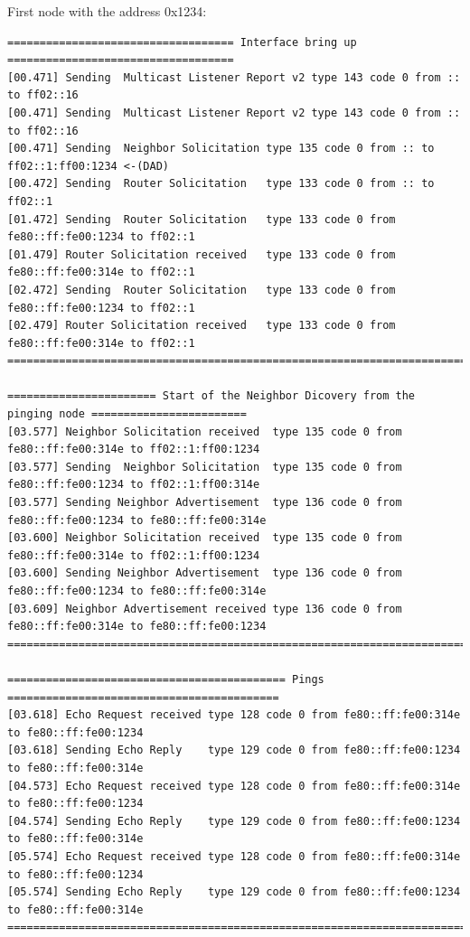 First node with the address 0x1234:
\begin{lstlisting}[numbers=none, basicstyle=\tiny]
=================================== Interface bring up ===================================
[00.471] Sending  Multicast Listener Report v2 type 143 code 0 from :: to ff02::16
[00.471] Sending  Multicast Listener Report v2 type 143 code 0 from :: to ff02::16
[00.471] Sending  Neighbor Solicitation type 135 code 0 from :: to ff02::1:ff00:1234 <-(DAD)
[00.472] Sending  Router Solicitation   type 133 code 0 from :: to ff02::1
[01.472] Sending  Router Solicitation   type 133 code 0 from fe80::ff:fe00:1234 to ff02::1
[01.479] Router Solicitation received   type 133 code 0 from fe80::ff:fe00:314e to ff02::1
[02.472] Sending  Router Solicitation   type 133 code 0 from fe80::ff:fe00:1234 to ff02::1
[02.479] Router Solicitation received   type 133 code 0 from fe80::ff:fe00:314e to ff02::1
==========================================================================================

======================= Start of the Neighbor Dicovery from the pinging node ========================
[03.577] Neighbor Solicitation received  type 135 code 0 from fe80::ff:fe00:314e to ff02::1:ff00:1234
[03.577] Sending  Neighbor Solicitation  type 135 code 0 from fe80::ff:fe00:1234 to ff02::1:ff00:314e
[03.577] Sending Neighbor Advertisement  type 136 code 0 from fe80::ff:fe00:1234 to fe80::ff:fe00:314e
[03.600] Neighbor Solicitation received  type 135 code 0 from fe80::ff:fe00:314e to ff02::1:ff00:1234
[03.600] Sending Neighbor Advertisement  type 136 code 0 from fe80::ff:fe00:1234 to fe80::ff:fe00:314e
[03.609] Neighbor Advertisement received type 136 code 0 from fe80::ff:fe00:314e to fe80::ff:fe00:1234
======================================================================================================

=========================================== Pings ==========================================
[03.618] Echo Request received type 128 code 0 from fe80::ff:fe00:314e to fe80::ff:fe00:1234
[03.618] Sending Echo Reply    type 129 code 0 from fe80::ff:fe00:1234 to fe80::ff:fe00:314e
[04.573] Echo Request received type 128 code 0 from fe80::ff:fe00:314e to fe80::ff:fe00:1234
[04.574] Sending Echo Reply    type 129 code 0 from fe80::ff:fe00:1234 to fe80::ff:fe00:314e
[05.574] Echo Request received type 128 code 0 from fe80::ff:fe00:314e to fe80::ff:fe00:1234
[05.574] Sending Echo Reply    type 129 code 0 from fe80::ff:fe00:1234 to fe80::ff:fe00:314e
============================================================================================
\end{lstlisting}


